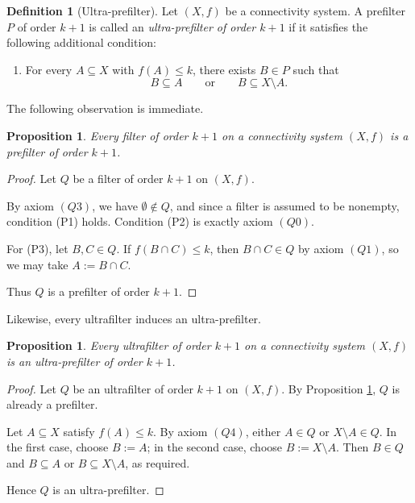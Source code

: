 \documentclass[10pt]{book}
\newtheorem{proposition}[theorem]{Proposition}
\theoremstyle{definition}
\newtheorem{definition}[theorem]{Definition}
\begin{document}
\begin{definition}[Ultra-prefilter]
\label{def:ultraprefilter}
Let \((X,f)\) be a connectivity system.
A prefilter \(P\) of order \(k+1\) is called an \emph{ultra-prefilter of order \(k+1\)} if it satisfies the following additional condition:
\begin{enumerate}
    \item[(P4)] For every \(A\subseteq X\) with \(f(A)\leq k\), there exists \(B\in P\) such that
    \[
    B\subseteq A
    \qquad\text{or}\qquad
    B\subseteq X\setminus A.
    \]
\end{enumerate}
\end{definition}

The following observation is immediate.

\begin{proposition}
\label{thm:filter_prefilter}
Every filter of order \(k+1\) on a connectivity system \((X,f)\) is a prefilter of order \(k+1\).
\end{proposition}

\begin{proof}
Let \(Q\) be a filter of order \(k+1\) on \((X,f)\).

By axiom \((Q3)\), we have \(\emptyset\notin Q\), and since a filter is assumed to be nonempty, condition (P1) holds.
Condition (P2) is exactly axiom \((Q0)\).

For (P3), let \(B,C\in Q\).
If \(f(B\cap C)\leq k\), then \(B\cap C\in Q\) by axiom \((Q1)\), so we may take \(A:=B\cap C\).

Thus \(Q\) is a prefilter of order \(k+1\).
\end{proof}

Likewise, every ultrafilter induces an ultra-prefilter.

\begin{proposition}
\label{thm:ultrafilter_ultraprefilter}
Every ultrafilter of order \(k+1\) on a connectivity system \((X,f)\) is an ultra-prefilter of order \(k+1\).
\end{proposition}

\begin{proof}
Let \(Q\) be an ultrafilter of order \(k+1\) on \((X,f)\).
By Proposition \ref{thm:filter_prefilter}, \(Q\) is already a prefilter.

Let \(A\subseteq X\) satisfy \(f(A)\leq k\).
By axiom \((Q4)\), either \(A\in Q\) or \(X\setminus A\in Q\).
In the first case, choose \(B:=A\); in the second case, choose \(B:=X\setminus A\).
Then \(B\in Q\) and \(B\subseteq A\) or \(B\subseteq X\setminus A\), as required.

Hence \(Q\) is an ultra-prefilter.
\end{proof}
\end{document}
